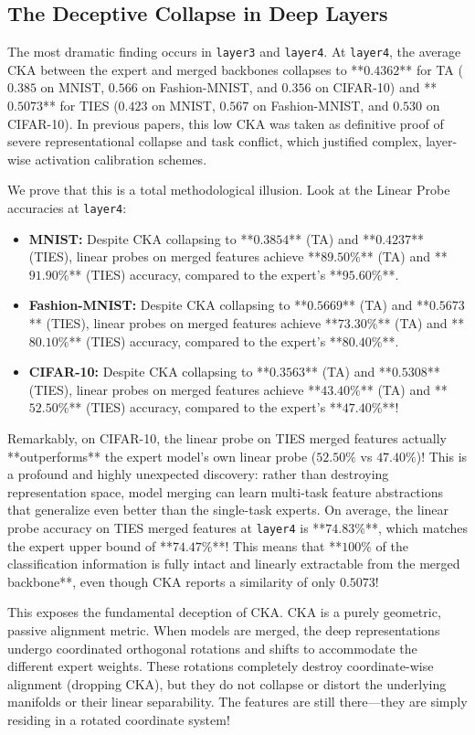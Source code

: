 \documentclass{article}
\theoremstyle{plain}
\theoremstyle{definition}
\theoremstyle{remark}
\begin{document}
\subsection{The Deceptive Collapse in Deep Layers}
The most dramatic finding occurs in \texttt{layer3} and \texttt{layer4}. At \texttt{layer4}, the average CKA between the expert and merged backbones collapses to **$0.4362$** for TA ($0.385$ on MNIST, $0.566$ on Fashion-MNIST, and $0.356$ on CIFAR-10) and **$0.5073$** for TIES ($0.423$ on MNIST, $0.567$ on Fashion-MNIST, and $0.530$ on CIFAR-10). In previous papers, this low CKA was taken as definitive proof of severe representational collapse and task conflict, which justified complex, layer-wise activation calibration schemes.

We prove that this is a total methodological illusion. Look at the Linear Probe accuracies at \texttt{layer4}:
\begin{itemize}
  \item \textbf{MNIST:} Despite CKA collapsing to **$0.3854$** (TA) and **$0.4237$** (TIES), linear probes on merged features achieve **$89.50\%$** (TA) and **$91.90\%$** (TIES) accuracy, compared to the expert's **$95.60\%$**.
  \item \textbf{Fashion-MNIST:} Despite CKA collapsing to **$0.5669$** (TA) and **$0.5673$** (TIES), linear probes on merged features achieve **$73.30\%$** (TA) and **$80.10\%$** (TIES) accuracy, compared to the expert's **$80.40\%$**.
  \item \textbf{CIFAR-10:} Despite CKA collapsing to **$0.3563$** (TA) and **$0.5308$** (TIES), linear probes on merged features achieve **$43.40\%$** (TA) and **$52.50\%$** (TIES) accuracy, compared to the expert's **$47.40\%$**!
\end{itemize}
Remarkably, on CIFAR-10, the linear probe on TIES merged features actually **outperforms** the expert model's own linear probe ($52.50\%$ vs $47.40\%$)! This is a profound and highly unexpected discovery: rather than destroying representation space, model merging can learn multi-task feature abstractions that generalize even better than the single-task experts.
On average, the linear probe accuracy on TIES merged features at \texttt{layer4} is **$74.83\%$**, which matches the expert upper bound of **$74.47\%$**! This means that **$100\%$ of the classification information is fully intact and linearly extractable from the merged backbone**, even though CKA reports a similarity of only $0.5073$!

This exposes the fundamental deception of CKA. CKA is a purely geometric, passive alignment metric. When models are merged, the deep representations undergo coordinated orthogonal rotations and shifts to accommodate the different expert weights. These rotations completely destroy coordinate-wise alignment (dropping CKA), but they do not collapse or distort the underlying manifolds or their linear separability. The features are still there—they are simply residing in a rotated coordinate system!
\end{document}
